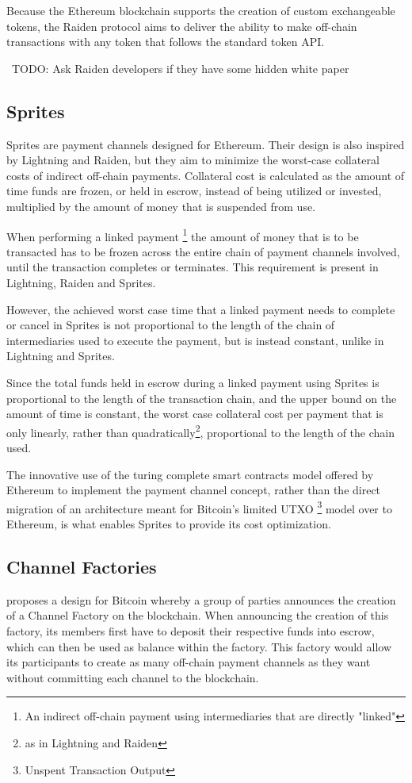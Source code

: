 \documentclass[12pt]{article}
\newcommand{\todo}[1]{{\color{red}\ TODO: {#1}}}
\begin{document}
Because the Ethereum blockchain supports the creation of custom exchangeable tokens, the Raiden protocol aims to deliver the ability to make off-chain transactions with any token that follows the standard token API\cite{ethereum}.

\todo{Ask Raiden developers if they have some hidden white paper}


\subsection{Sprites}
Sprites\cite{sprites} are payment channels designed for Ethereum. Their design is also inspired by Lightning and Raiden, but they aim to minimize the worst-case collateral costs of indirect off-chain payments. Collateral cost is calculated as the amount of time funds are frozen, or held in escrow, instead of being utilized or invested, multiplied by the amount of money that is suspended from use.

When performing a linked payment
\footnote{An indirect off-chain payment using intermediaries that are directly "linked"}
the amount of money that is to be transacted has to be frozen across the entire chain of payment channels involved, until the transaction completes or terminates. This requirement is present in Lightning, Raiden and Sprites.

However, the achieved worst case time that a linked payment needs to complete or cancel in Sprites is not proportional to the length of the chain of intermediaries used to execute the payment, but is instead constant, unlike in Lightning and Sprites.

Since the total funds held in escrow during a linked payment using Sprites is proportional to the length of the transaction chain, and the upper bound on the amount of time is constant, the worst case collateral cost per payment that is only linearly, rather than quadratically\footnote{as in Lightning and Raiden}, proportional to the length of the chain used.

The innovative use of the turing complete smart contracts model offered by Ethereum to implement the payment channel concept, rather than the direct migration of an architecture meant for Bitcoin's limited UTXO
\footnote{Unspent Transaction Output}
model over to Ethereum, is what enables Sprites to provide its cost optimization.

\subsection{Channel Factories}
\cite{scale} proposes a design for Bitcoin whereby a group of parties announces the creation of a Channel Factory on the blockchain. When announcing the creation of this factory, its members first have to deposit their respective funds into escrow, which can then be used as balance within the factory. This factory would allow its participants to create as many off-chain payment channels as they want without committing each channel to the blockchain.
\end{document}
